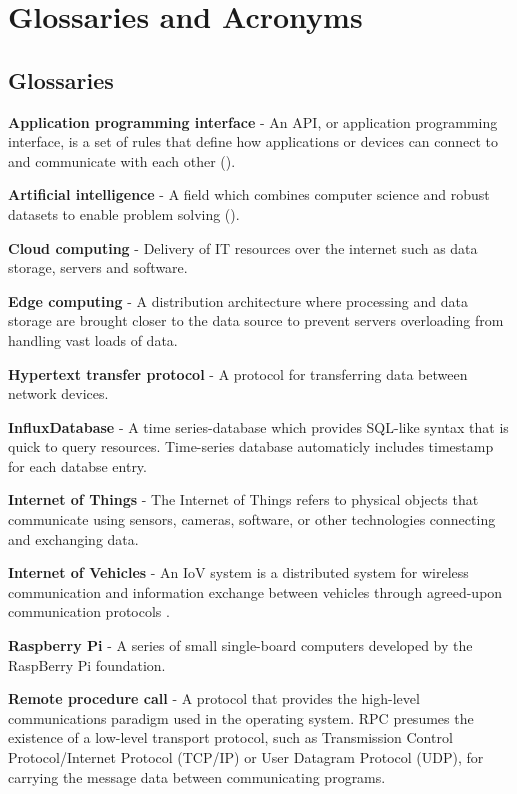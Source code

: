 \chapter{Glossaries and Acronyms}
\section{Glossaries}
\textbf{Application programming interface} - An API, or application programming interface, is a set of rules that define how applications or devices can connect to and communicate with each other (\cite{rest_api}).

\textbf{Artificial intelligence} - A field which combines computer science and robust datasets to enable problem solving (\cite{artificial_intelligence}).

\textbf{Cloud computing} - Delivery of IT resources over the internet such as data storage, servers and software.  

\textbf{Edge computing} - A distribution architecture where processing and data storage are brought closer to the data source to prevent servers overloading from handling vast loads of data.  

\textbf{Hypertext transfer protocol} - A protocol for transferring data between network devices.

\textbf{InfluxDatabase} - A time series-database which provides SQL-like syntax that is quick to query resources. Time-series database automaticly includes timestamp for each databse entry. 

\textbf{Internet of Things} - The Internet of Things refers to physical objects that communicate using sensors, cameras, software, or other technologies connecting and exchanging data. 

\textbf{Internet of Vehicles} - An IoV system is a distributed system for wireless communication and information exchange between vehicles through agreed-upon communication protocols \parencite{chinese_iov}.

\textbf{Raspberry Pi} - A series of small single-board computers developed by the RaspBerry Pi foundation. 

\textbf{Remote procedure call} - A protocol that provides the high-level communications paradigm used in the operating system. RPC presumes the existence of a low-level transport protocol, such as Transmission Control Protocol/Internet Protocol (TCP/IP) or User Datagram Protocol (UDP), for carrying the message data between communicating programs. \parencite{rpc_ibm}

